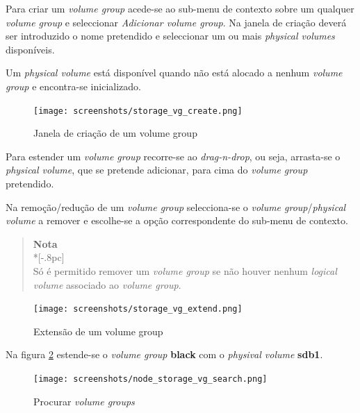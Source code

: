 Para criar um \emph{volume group} acede-se ao sub-menu de contexto sobre um qualquer \emph{volume group} e seleccionar \emph{Adicionar volume group}.
Na janela de criação deverá ser introduzido o nome pretendido e seleccionar um ou mais \emph{physical volumes} disponíveis.

Um \emph{physical volume} está disponível quando não está alocado a nenhum \emph{volume group} e encontra-se inicializado.

\begin{figure}[H]
        \begin{center}
        \texttt{[image: screenshots/storage\_vg\_create.png]}
        \caption{Janela de criação de um volume group}
        \label{fig:storage_vg_create}
        \end{center}
\end{figure}

Para estender um \emph{volume group} recorre-se ao \emph{drag-n-drop}, ou seja, arrasta-se o \emph{physical volume}, que se pretende adicionar, para cima do \emph{volume group} pretendido.

Na remoção/redução de um \emph{volume group} selecciona-se o \emph{volume group}/\emph{physical volume} a remover e escolhe-se a opção correspondente do sub-menu de contexto.
\begin{quote}
	{\large \bf Nota} \\*[-.8pc]
	\underline{\hspace{6in}} \\
	Só é permitido remover um \emph{volume group} se não houver nenhum \emph{logical volume} associado ao \emph{volume group}.
\end{quote}
 
\begin{figure}[H]
        \begin{center}
        \texttt{[image: screenshots/storage\_vg\_extend.png]}
        \caption{Extensão de um volume group}
        \label{fig:storage_vg_extend}
        \end{center}
\end{figure}

Na figura \ref{fig:storage_vg_extend} estende-se o \emph{volume group} {\bf black} com o \emph{physival volume} {\bf sdb1}.

\begin{figure}[H]
        \begin{center}
        \texttt{[image: screenshots/node\_storage\_vg\_search.png]}
        \caption{Procurar \emph{volume groups}}
        \label{fig:storage_vg_search}
        \end{center}
\end{figure}

